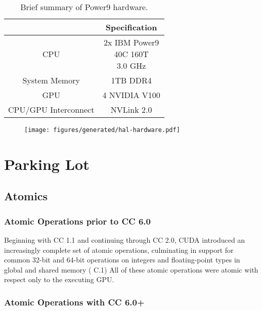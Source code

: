 \begin{table}[]
    \centering
    \caption[Power9 hardware summary.]{
        Brief summary of Power9 hardware.
        }
    \label{tab:hal}
    \begin{tabular}{|c|c|}
    \hline
    \textbf{} & \textbf{Specification}                              \\ \hline
    CPU           & \makecell{2x IBM Power9 \\ 40C 160T \\ 3.0 GHz  }  \\ \hline
    System Memory & 1TB DDR4                                   \\ \hline
	GPU           & 4 NVIDIA V100                                   \\ \hline
	CPU/GPU Interconnect  & NVLink 2.0                                      \\ \hline
    \end{tabular}
\end{table}

\begin{figure}
    \centering
	\texttt{[image: figures/generated/hal-hardware.pdf]}
    \caption[Power9 Hardware]{}
    \label{fig:topo-dgx-simple}
\end{figure}


\section{Parking Lot}

\subsection{Atomics}

\subsubsection{Atomic Operations prior to CC 6.0}

Beginning with CC 1.1 and continuing through CC 2.0, CUDA introduced an increasingly complete set of atomic operations, culminating in support for common 32-bit and 64-bit operations on integers and floating-point types in global and shared memory (\cite{nvidia2008cuda20} C.1)
All of these atomic operations were atomic with respect only to the executing GPU.

\subsubsection{Atomic Operations with CC 6.0+}


